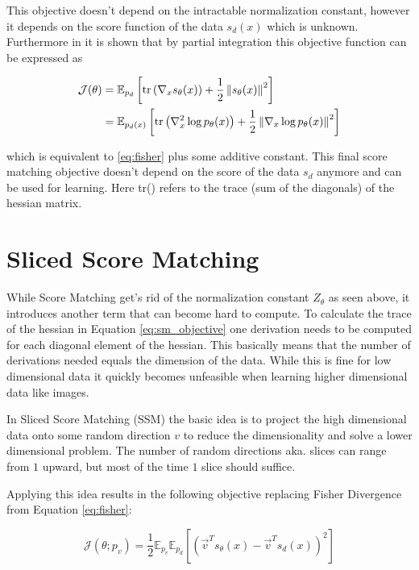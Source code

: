 This objective doesn't depend on the intractable normalization constant, however it depends on the score function of the data 
$s_d(x)$ which is unknown. Furthermore in \cite{sm} it is shown that by partial integration this objective function can be expressed as 

\begin{align}
    \label{eq:sm_objective}
    \mathcal{J}(\theta) & = \mathbb{E}_{p_d} \left[\text{tr} \left( \nabla_x s_\theta(x) \right) + \frac{1}{2} \left\| s_\theta(x) \right\|^2 \right] \notag \\ 
    & = \mathbb{E}_{p_d(x)} \left[\text{tr} \left( \nabla_x^2 \log p_\theta(x) \right) + \frac{1}{2} \left\| \nabla_x \log p_\theta(x) \right\|^2 \right]
\end{align}

which is equivalent to \ref{eq:fisher} plus some additive constant. This final score matching objective doesn't depend on the score of the data $s_d$ anymore and can be used for learning. Here tr() refers to the
trace (sum of the diagonals) of the hessian matrix.

\section{Sliced Score Matching}
\label{sec:ssm}

While Score Matching get's rid of the normalization constant $Z_\theta$ as seen above, it introduces another term that can become hard
to compute. To calculate the trace of the hessian in Equation \ref{eq:sm_objective} one derivation needs to be computed for each diagonal element of the hessian.
This basically means that the number of derivations needed equals the dimension of the data. 
While this is fine for low dimensional data it quickly becomes unfeasible when
learning higher dimensional data like images.  

In Sliced Score Matching (SSM) \cite{ssm} the basic idea is to project the high dimensional data onto some random direction $v$ to reduce 
the dimensionality and solve a lower dimensional problem. The number of random directions aka. slices can range from $1$ upward, but 
most of the time $1$ slice should suffice. 

Applying this idea results in the following objective replacing Fisher Divergence from Equation \ref{eq:fisher}: 

\begin{equation}
    \label{eq:ssm}
    \mathcal{J}(\theta; p_v) = \frac{1}{2} \mathbb{E}_{p_v} \mathbb{E}_{p_d} \left[ \left( \vec{v}^T s_\theta(x) - \vec{v}^T s_d(x) \right)^2 \right]
\end{equation}

